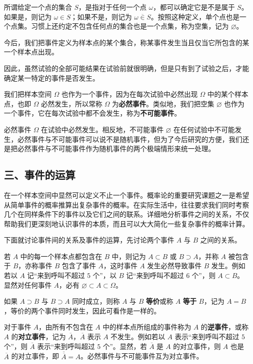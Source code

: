 \documentclass[../../main.tex]{subfiles}
\begin{document}
所谓给定一个点的集合 $S$，是指对于任何一个点 $\omega$，都可以确定它是不是属于 $S$。如果是，则记为 $\omega\in S$；如果不是，则记为 $\omega\overline{\in}S$。按照这种定义，单个点也是一个点集。习惯上还约定不包含任何点的集合也是一个点集，称为空集，记为 $\varnothing$。

今后，我们把事件定义为样本点的某个集合，称某事件发生当且仅当它所包含的某一个样本点出现。

因此，虽然试验的全部可能结果在试验前就很明确，但是只有到了试验之后，才能确定某一特定的事件是否发生。

我们把样本空间 $\Omega$ 也作为一个事件，因为在每次试验中必然出现 $\Omega$ 中的某个样本点，也即 $\Omega$ 必然发生，所以常称 $\Omega$ 为\textbf{必然事件}。类似地，我们把空集 $\varnothing$ 也作为一个事件，它在每次试验中都不会发生，称为\textbf{不可能事件}。

必然事件 $\Omega$ 在试验中必然发生。相反地，不可能事件 $\varnothing$ 在任何试验中不可能发生，必然事件与不可能事件可以说不是随机事件，但为了今后研究的方便，我们还是把必然事件与不可能事件作为随机事件的两个极端情形来统一处理。

\subsection*{三、事件的运算}

在一个样本空间中显然可以定义不止一个事件。概率论的重要研究课题之一是希望从简单事件的概率推算出复杂事件的概率。在实际生活中，往往要求我们同时考察几个在同样条件下的事件以及它们之间的联系。详细地分析事件之间的关系，不仅帮助我们更深刻地认识事件的本质，而且可以大大简化一些复杂事件的概率计算。

下面就讨论事件间的关系及事件的运算，先讨论两个事件 $A$ 与 $B$ 之间的关系。

若 $A$ 中的每一个样本点都包含在 $B$ 中，则记为 $A\subset B$ 或 $B\supset A$，并称 $A$ 被包含于 $B$，亦称事件 $B$ 包含了事件 $A$，这时事件 $A$ 发生必然导致事件 $B$ 发生。例如若以 $A$ 记“来到呼叫不超过 $5$ 个”，以 $B$ 记“来到呼叫不超过 $6$ 个”，则 $A\subset B$。显然对任何事件 $A$，必有 $\varnothing\subset A\subset\Omega$。

如果 $A\supset B$ 与 $B\supset A$ 同时成立，则称 $A$ 与 $B$ \textbf{等价}或称 $A$ \textbf{等于} $B$，记为 $A=B$，等价的两个事件同时发生，因此可看作是一样的。

对于事件 $A$，由所有不包含在 $A$ 中的样本点所组成的事件称为 $A$ 的\textbf{逆事件}，或称 $A$ 的\textbf{对立事件}，记为 $\overline{A}$，$\overline{A}$ 表示 $A$ 不发生。例如若以 $A$ 表示“来到呼叫不超过 $5$ 个”，则 $\overline{A}$ 表示“来到呼叫超过 $5$ 个”。显然，若 $\overline{A}$ 是 $A$ 的对立事件，则 $A$ 也是 $\overline{A}$ 的对立事件，即 $\overline{\overline{A}}=A$。必然事件与不可能事件互为对立事件。
\end{document}
